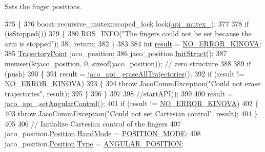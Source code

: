 Sets the finger positions. 


\begin{DoxyCode}
375 \{
376     boost::recursive\_mutex::scoped\_lock lock(\hyperlink{classjaco_1_1JacoComm_ac6ef2a6b3c51877fc4237d834c35908a}{api\_mutex\_});
377 
378     \textcolor{keywordflow}{if} (\hyperlink{classjaco_1_1JacoComm_a872b8033cda5a9fe4ccdca2e89aa03d1}{isStopped}())
379     \{
380         ROS\_INFO(\textcolor{stringliteral}{"The fingers could not be set because the arm is stopped"});
381         \textcolor{keywordflow}{return};
382     \}
383 
384     \textcolor{keywordtype}{int} \hyperlink{Kinova_8API_8CommLayerUbuntu_8h_a900dac90961bada00f57c207562a6a9a}{result} = \hyperlink{Kinova_8API_8CommLayerUbuntu_8h_a510f2320a2a31d2d225adc0da7bef595}{NO\_ERROR\_KINOVA};
385     \hyperlink{structTrajectoryPoint}{TrajectoryPoint} jaco\_position;
386     jaco\_position.\hyperlink{structTrajectoryPoint_a1a9f12ad88f5011c6a4644792fa67f99}{InitStruct}();
387     memset(&jaco\_position, 0, \textcolor{keyword}{sizeof}(jaco\_position));  \textcolor{comment}{// zero structure}
388 
389     \textcolor{keywordflow}{if} (push)
390     \{
391         result = \hyperlink{classjaco_1_1JacoComm_a8d1510c941f28a4e8f921691d4fd2248}{jaco\_api\_}.\hyperlink{classjaco_1_1JacoAPI_a97db09d91923328b1780bb50a0e2548d}{eraseAllTrajectories}();
392         \textcolor{keywordflow}{if} (result != \hyperlink{Kinova_8API_8CommLayerUbuntu_8h_a510f2320a2a31d2d225adc0da7bef595}{NO\_ERROR\_KINOVA})
393         \{
394             \textcolor{keywordflow}{throw} JacoCommException(\textcolor{stringliteral}{"Could not erase trajectories"}, result);
395         \}
396     \}
397 
398     \textcolor{comment}{//startAPI();}
399 
400     result = \hyperlink{classjaco_1_1JacoComm_a8d1510c941f28a4e8f921691d4fd2248}{jaco\_api\_}.\hyperlink{classjaco_1_1JacoAPI_a4ce9340d50866cf102722ad6c370bdfd}{setAngularControl}();
401     \textcolor{keywordflow}{if} (result != \hyperlink{Kinova_8API_8CommLayerUbuntu_8h_a510f2320a2a31d2d225adc0da7bef595}{NO\_ERROR\_KINOVA})
402     \{
403         \textcolor{keywordflow}{throw} JacoCommException(\textcolor{stringliteral}{"Could not set Cartesian control"}, result);
404     \}
405 
406     \textcolor{comment}{// Initialize Cartesian control of the fingers}
407     jaco\_position.\hyperlink{structTrajectoryPoint_aa24430dc273e9d7968a6c44e3bcee259}{Position}.\hyperlink{structUserPosition_a83779902810d0e5e16d533e0f964c0df}{HandMode} = \hyperlink{KinovaTypes_8h_ad7050e4cfb6e844e9be962fba8eeb817a21de3478520bbc47e9c35e3e651a06bf}{POSITION\_MODE};
408     jaco\_position.\hyperlink{structTrajectoryPoint_aa24430dc273e9d7968a6c44e3bcee259}{Position}.\hyperlink{structUserPosition_a93c748d4ee51239fcbcd487d88e52ffa}{Type} = \hyperlink{KinovaTypes_8h_a0a1c22d235ef1b13cfcd1419d10babc9acec3b882918c5c90a239fd07290d6031}{ANGULAR\_POSITION};

\end{DoxyCode}
